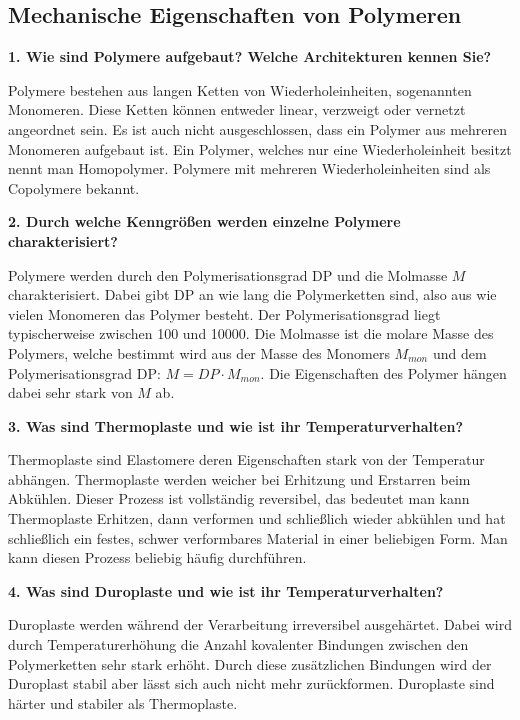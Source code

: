 \subsection{Mechanische Eigenschaften von Polymeren}
\noindent\textbf{1. Wie sind Polymere aufgebaut? Welche Architekturen kennen Sie?}\\
\begin{addmargin}[25pt]{0pt}
Polymere bestehen aus langen Ketten von Wiederholeinheiten, sogenannten Monomeren. Diese Ketten können entweder linear, verzweigt oder vernetzt angeordnet sein. Es ist auch nicht ausgeschlossen, dass ein Polymer aus mehreren Monomeren aufgebaut ist. Ein Polymer, welches nur eine Wiederholeinheit besitzt nennt man Homopolymer. Polymere mit mehreren Wiederholeinheiten sind als Copolymere bekannt. \\
\end{addmargin}

\noindent\textbf{2. Durch welche Kenngrößen werden einzelne Polymere charakterisiert?}\\
\begin{addmargin}[25pt]{0pt}
Polymere werden durch den Polymerisationsgrad DP und die Molmasse $M$ charakterisiert. Dabei gibt DP an wie lang die Polymerketten sind, also aus wie vielen Monomeren das Polymer besteht. Der Polymerisationsgrad liegt typischerweise zwischen 100 und 10000. Die Molmasse ist die molare Masse des Polymers, welche bestimmt wird aus der Masse des Monomers $M_{\si{mon}}$ und dem Polymerisationsgrad DP: $M = \si{DP} \cdot M_{\si{mon}}$. Die Eigenschaften des Polymer hängen dabei sehr stark von $M$ ab.  \\
\end{addmargin}

\noindent\textbf{3. Was sind Thermoplaste und wie ist ihr Temperaturverhalten?}\\
\begin{addmargin}[25pt]{0pt}
Thermoplaste sind Elastomere deren Eigenschaften stark von der Temperatur abhängen. Thermoplaste werden weicher bei Erhitzung und Erstarren beim Abkühlen. Dieser Prozess ist vollständig reversibel, das bedeutet man kann Thermoplaste Erhitzen, dann verformen und schließlich wieder abkühlen und hat schließlich ein festes, schwer verformbares Material in einer beliebigen Form. Man kann diesen Prozess beliebig häufig durchführen. \\
\end{addmargin}

\noindent\textbf{4. Was sind Duroplaste und wie ist ihr Temperaturverhalten?}\\
\begin{addmargin}[25pt]{0pt}
Duroplaste werden während der Verarbeitung irreversibel ausgehärtet. Dabei wird durch Temperaturerhöhung die Anzahl kovalenter Bindungen zwischen den Polymerketten sehr stark erhöht. Durch diese zusätzlichen Bindungen wird der Duroplast stabil aber lässt sich auch nicht mehr zurückformen. Duroplaste sind härter und stabiler als Thermoplaste.\\
\end{addmargin}

